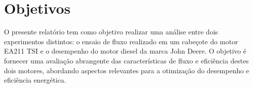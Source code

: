\section{Objetivos}

O presente relatório tem como objetivo realizar uma análise entre dois experimentos distintos: o ensaio de fluxo realizado em um cabeçote do motor EA211 TSI e o desempenho do motor diesel da marca John Deere. O objetivo é fornecer uma avaliação abrangente das características de fluxo e eficiência destes dois motores, abordando aspectos relevantes para a otimização do desempenho e eficiência energética. 



